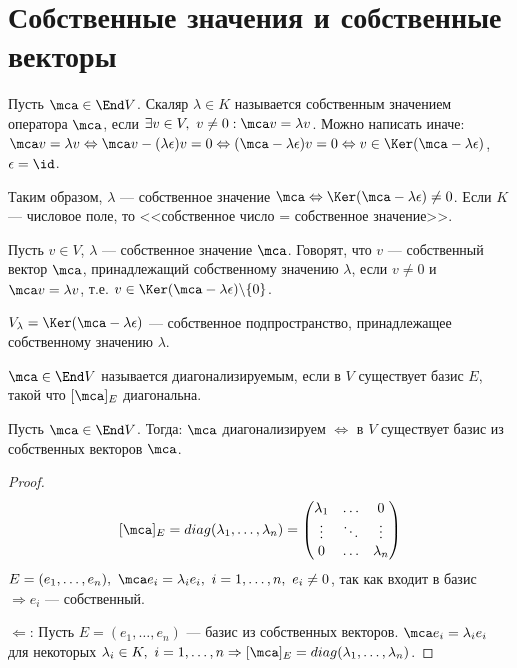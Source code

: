 \documentclass[main]{subfiles}
\begin{document}
\chapter{Собственные значения и собственные векторы}

Пусть $\mca \in \End V$. Скаляр $\lambda \in K$ называется собственным значением оператора
$\mca$, если $\exists v \in V,\ v \neq 0 : \mca v = \lambda v$.
Можно написать иначе: $\mca v = \lambda v \Leftrightarrow \mca v - (\lambda \epsilon) v = 0
    \Leftrightarrow (\mca -\lambda\epsilon)v = 0
    \Leftrightarrow v \in \Ker(\mca -\lambda\epsilon)$, $\epsilon = \id$.

\begin{definition}
    Таким образом, $\lambda$  —  собственное значение $\mca
        \Leftrightarrow  \Ker(\mca -\lambda\epsilon) \neq 0$.
    Если $K$ — числовое поле, то <<собственное число = собственное значение>>.
\end{definition}

\begin{definition}
    Пусть $v \in V$, $\lambda$ — собственное значение $\mca$.
    Говорят, что $v$ — собственный вектор $\mca$, принадлежащий собственному значению
    $\lambda$, если $v \neq 0$ и $\mca v = \lambda v$,
    т.е. $v \in \Ker (\mca - \lambda \epsilon) \backslash  \{0\}$.
\end{definition}

\begin{definition}
    $V_\lambda = \Ker(\mca - \lambda \epsilon)$ —
    собственное подпространство, принадлежащее собственному значению $\lambda$.
\end{definition}

\begin{definition}
    $\mca  \in \End V$ называется диагонализируемым, если в $V$ существует
    базис $E$, такой что $[\mca]_E$ диагональна.
\end{definition}

\begin{proposition}
    Пусть $\mca \in \End V$. Тогда: $\mca$ диагонализируем
    $\Leftrightarrow$ в $V$ существует базис из собственных векторов $\mca$.
\end{proposition}

\begin{proof}
    \[ [\mca]_E = diag(\lambda_1, \ldots, \lambda_n) = \begin{pmatrix}
            \lambda_1 & \ldots & 0         \\
            \vdots    & \ddots & \vdots    \\
            0         & \ldots & \lambda_n \\
        \end{pmatrix}\]
    $ E = (e_1, \ldots, e_n),\ \mca e_i = \lambda_i e_i,\ i = 1, \ldots, n,\ e_i \neq 0 $,
    так как входит в базис $\Rightarrow e_i$ — собственный.

    $\Leftarrow$: Пусть  $E = (e_1, \ldots, e_n)$ — базис из собственных векторов.
    $\mca e_i = \lambda_i e_i$ для некоторых $\lambda_i \in K, \ i = 1, \ldots, n
        \Rightarrow [\mca]_E
        = diag(\lambda_1, \ldots, \lambda_n)$.
\end{proof}
\end{document}
